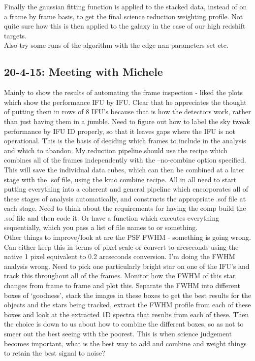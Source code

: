 \documentclass{literature}
\begin{document}
Finally the gaussian fitting function is applied to the stacked data, instead of on a frame by frame basis, to get the final science reduction weighting profile. Not quite sure how this is then applied to the galaxy in the case of our high redshift targets. \\ 

Also try some runs of the algorithm with the edge nan parameters set etc. 

\subsection{20-4-15: Meeting with Michele}
Mainly to show the results of automating the frame inspection - liked the plots which show the performance IFU by IFU. Clear that he appreciates the thought of putting them in rows of 8 IFU's because that is how the detectors work, rather than just having them in a jumble. Need to figure out how to label the sky tweak performance by IFU ID properly, so that it leaves gaps where the IFU is not operational. This is the basis of deciding which frames to include in the analysis and which to abandon. My reduction pipeline should use the recipe which combines all of the frames independently with the --no-combine option specified. This will save the individual data cubes, which can then be combined at a later stage with the .sof file, using the kmo combine recipe. All in all need to start putting everything into a coherent and general pipeline which encorporates all of these stages of analysis automatically, and constructs the appropriate .sof file at each stage. Need to think about the requirements for having the comp build the .sof file and then code it. Or have a function which executes everything sequentially, which you pass a list of file names to or something. \\ 
Other things to improve/look at are the PSF FWHM - something is going wrong. Can either keep this in terms of pixel scale or convert to arcseconds using the native 1 pixel equivalent to 0.2 arcseconds conversion. I'm doing the FWHM analysis wrong. Need to pick one particularly bright star on one of the IFU's and track this throughout all of the frames. Monitor how the FWHM of this star changes from frame to frame and plot this. Separate the FWHM into different boxes of `goodness', stack the images in these boxes to get the best results for the objects and the stars being tracked, extract the FWHM profile from each of these boxes and look at the extracted 1D spectra that results from each of these. Then the choice is down to us about how to combine the different boxes, so as not to smeer out the best seeing with the poorest. This is when science judgement becomes important, what is the best way to add and combine and weight things to retain the best signal to noise?  
\end{document}
